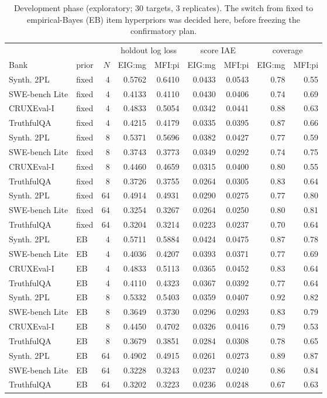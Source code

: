 \begin{table}[tbp]
\centering\scriptsize
\caption{Development phase (exploratory; 30 targets, 3 replicates). The switch from fixed to empirical-Bayes (EB) item hyperpriors was decided here, before freezing the confirmatory plan.}
\label{tab:dev}
\begin{tabular}{@{}llrrrrrrr@{}}
\toprule
 & & & \multicolumn{2}{c}{holdout log loss} & \multicolumn{2}{c}{score IAE} & \multicolumn{2}{c}{coverage} \\
\cmidrule(lr){4-5}\cmidrule(lr){6-7}\cmidrule(lr){8-9}
Bank & prior & $N$ & EIG:mg & MFI:pi & EIG:mg & MFI:pi & EIG:mg & MFI:pi \\
\midrule
Synth. 2PL & fixed & 4 & 0.5762 & 0.6410 & 0.0433 & 0.0543 & 0.78 & 0.55 \\
SWE-bench Lite & fixed & 4 & 0.4133 & 0.4110 & 0.0430 & 0.0406 & 0.74 & 0.69 \\
CRUXEval-I & fixed & 4 & 0.4833 & 0.5054 & 0.0342 & 0.0441 & 0.88 & 0.63 \\
TruthfulQA & fixed & 4 & 0.4215 & 0.4179 & 0.0335 & 0.0395 & 0.87 & 0.66 \\
Synth. 2PL & fixed & 8 & 0.5371 & 0.5696 & 0.0382 & 0.0427 & 0.77 & 0.59 \\
SWE-bench Lite & fixed & 8 & 0.3743 & 0.3773 & 0.0349 & 0.0292 & 0.74 & 0.75 \\
CRUXEval-I & fixed & 8 & 0.4460 & 0.4659 & 0.0315 & 0.0400 & 0.80 & 0.55 \\
TruthfulQA & fixed & 8 & 0.3726 & 0.3755 & 0.0264 & 0.0305 & 0.83 & 0.64 \\
Synth. 2PL & fixed & 64 & 0.4914 & 0.4931 & 0.0290 & 0.0275 & 0.77 & 0.80 \\
SWE-bench Lite & fixed & 64 & 0.3254 & 0.3267 & 0.0264 & 0.0250 & 0.80 & 0.81 \\
TruthfulQA & fixed & 64 & 0.3204 & 0.3214 & 0.0223 & 0.0237 & 0.70 & 0.64 \\
Synth. 2PL & EB & 4 & 0.5711 & 0.5884 & 0.0424 & 0.0475 & 0.87 & 0.78 \\
SWE-bench Lite & EB & 4 & 0.4036 & 0.4207 & 0.0393 & 0.0371 & 0.77 & 0.69 \\
CRUXEval-I & EB & 4 & 0.4833 & 0.5113 & 0.0365 & 0.0452 & 0.83 & 0.64 \\
TruthfulQA & EB & 4 & 0.4110 & 0.4323 & 0.0367 & 0.0392 & 0.77 & 0.64 \\
Synth. 2PL & EB & 8 & 0.5332 & 0.5403 & 0.0359 & 0.0407 & 0.92 & 0.82 \\
SWE-bench Lite & EB & 8 & 0.3649 & 0.3730 & 0.0296 & 0.0293 & 0.83 & 0.79 \\
CRUXEval-I & EB & 8 & 0.4450 & 0.4702 & 0.0326 & 0.0416 & 0.79 & 0.53 \\
TruthfulQA & EB & 8 & 0.3679 & 0.3851 & 0.0284 & 0.0308 & 0.78 & 0.65 \\
Synth. 2PL & EB & 64 & 0.4902 & 0.4915 & 0.0261 & 0.0273 & 0.89 & 0.87 \\
SWE-bench Lite & EB & 64 & 0.3228 & 0.3243 & 0.0237 & 0.0240 & 0.86 & 0.84 \\
TruthfulQA & EB & 64 & 0.3202 & 0.3223 & 0.0236 & 0.0248 & 0.67 & 0.63 \\
\bottomrule
\end{tabular}
\end{table}
